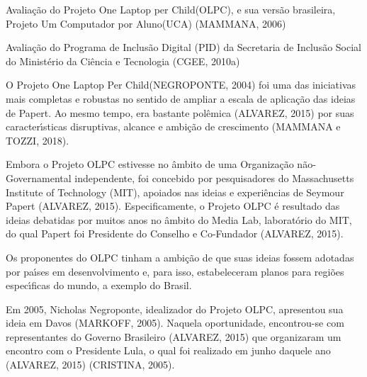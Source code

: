 \documentclass[
12pt,		%
openright,	%
twoside,  %
a4paper,			%
chapter=TITLE,		%
english,			%
french,				%
spanish,			%
brazil				%
]{USPSC-classe/USPSC}
\begin{document}
\begin{alineas}
\item Avalia\c{c}\~ao do Projeto \textquotedbl One Laptop per Child\textquotedbl  (OLPC), e sua vers\~ao brasileira, \textquotedbl Projeto Um Computador por Aluno\textquotedbl  (UCA)  (MAMMANA, 2006)
\item Avalia\c{c}\~ao do Programa de Inclus\~ao Digital (PID) da Secretaria de Inclus\~ao Social do Minist\'erio da Ci\^encia e Tecnologia  (CGEE, 2010a)
\end{alineas}

O Projeto \textquotedbl One Laptop Per Child\textquotedbl  (NEGROPONTE, 2004) foi uma das iniciativas mais completas e robustas no sentido de ampliar a escala de aplica\c{c}\~ao das ideias de Papert. Ao mesmo tempo, era bastante pol\^emica (ALVAREZ, 2015) por suas caracter\'{\i}sticas disruptivas, alcance e ambi\c{c}\~ao de crescimento (MAMMANA e TOZZI, 2018).









Embora o Projeto OLPC estivesse no \^ambito de uma Organiza\c{c}\~ao n\~ao-Governamental independente,  foi concebido por pesquisadores do Massachusetts Institute of Technology (MIT), apoiados nas ideias e experi\^encias de Seymour Papert  (ALVAREZ, 2015). Especificamente, o Projeto OLPC \'e resultado das ideias debatidas por muitos anos no \^ambito do Media Lab, laborat\'orio do MIT, do qual Papert foi Presidente do Conselho e Co-Fundador  (ALVAREZ, 2015).









Os proponentes do OLPC tinham a ambi\c{c}\~ao de que suas ideias fossem adotadas por pa\'{\i}ses em desenvolvimento e, para isso, estabeleceram planos para regi\~oes espec\'{\i}ficas do mundo, a exemplo do Brasil.









Em 2005, Nicholas Negroponte, idealizador do Projeto OLPC, apresentou sua ideia em Davos (MARKOFF, 2005). Naquela oportunidade, encontrou-se com representantes do Governo Brasileiro (ALVAREZ, 2015) que organizaram um encontro com o Presidente Lula, o qual foi realizado em junho daquele ano (ALVAREZ, 2015) (CRISTINA, 2005).
\end{document}
